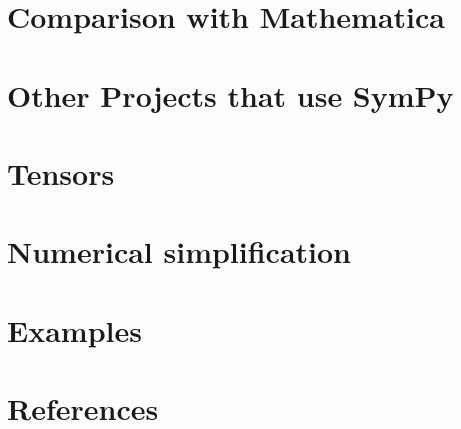 \documentclass[supplement]{siamart0216}
\begin{document}


\section{Comparison with Mathematica}



\section{Other Projects that use SymPy}




\section{Tensors}




\section{Numerical simplification}



\section{Examples}



\section{References}



\end{document}
